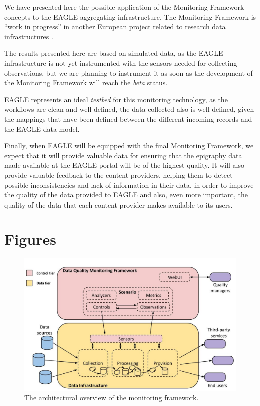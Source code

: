 \documentclass[amsthm,ebook]{saparticle}
\begin{document}
\noindent We have presented here the possible application of the Monitoring Framework concepts to the EAGLE aggregating infrastructure. The Monitoring Framework is ``work in progress'' in another European project related to research data infrastructures \citep{openaire}.

The results presented here are based on simulated data, as the EAGLE infrastructure is not yet instrumented with the sensors needed for collecting observations, but we are planning to instrument it as soon as the development of the Monitoring Framework will reach the \textit{beta} status. 

EAGLE represents an ideal \textit{testbed} for this monitoring technology, as the workflows are clean and well defined, the data collected also is well defined, given the mappings that have been defined between the different incoming records and the EAGLE data model. 

Finally, when EAGLE will be equipped with the final Monitoring Framework, we expect that it will provide valuable data for ensuring that the epigraphy data made available at the EAGLE portal will be of the highest quality. It will also provide valuable feedback to the content providers, helping them to detect possible inconsistencies and lack of information in their data, in order to improve the quality of the data provided to EAGLE and also, even more important, the quality of the data that each content provider makes available to its users.
\clearpage

\section{Figures}\label{sec:figures}
\begin{figure}[H]
\centering
\includegraphics[width=\textwidth]{img/arch.jpg}
\caption{The architectural overview of the monitoring framework.}
\label{fig:arch}
\end{figure}
\end{document}
